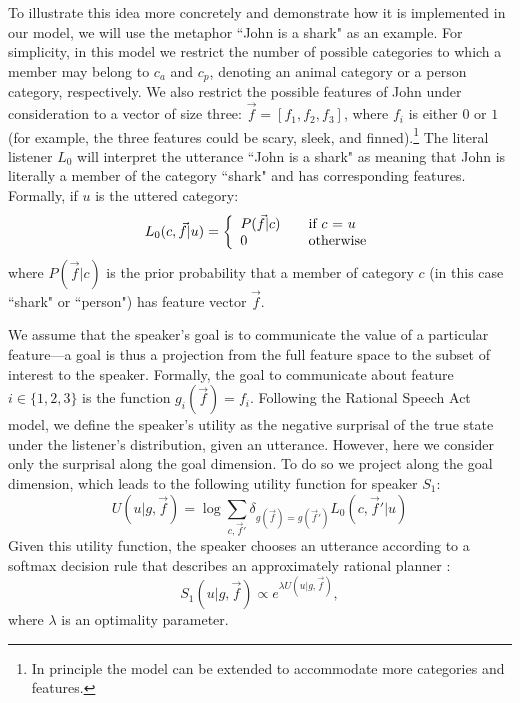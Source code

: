\documentclass[10pt,letterpaper]{article}
\begin{document}
To illustrate this idea more concretely and demonstrate how it is implemented in our model, we will use the metaphor ``John is a shark" as an example. For simplicity, in this model we restrict the number of possible categories to which a member may belong to $c_a$ and $c_p$, denoting an animal category or a person category, respectively. We also restrict the possible features of John under consideration to a vector of size three: $\vec f = [f_1, f_2, f_3]$, where $f_i$ is either $0$ or $1$ (for example, the three features could be scary, sleek, and finned).\footnote{In principle the model can be extended to accommodate more categories and features.}
The literal listener $L_0$ will interpret the utterance ``John is a shark" as meaning that John is literally a member of the category ``shark" and has corresponding features. Formally, if $u$ is the uttered category:
\[ L_0(c, \vec f |u) = \left\{ 
  \begin{array}{l l}
    P(\vec f | c) & \quad \text{if $c$ = $u$}\\
    0 & \quad \text{otherwise}
  \end{array} \right.\]
where $P(\vec f | c)$ is the prior probability that a member of category $c$ (in this case ``shark" or ``person") has feature vector $\vec f$.

We assume that the speaker's goal is to communicate the value of a particular feature---a goal is thus a projection from the full feature space to the subset of interest to the speaker. Formally, the goal to communicate about feature $i \in \{1,2,3\}$ is the function $g_i(\vec f) = f_i$. Following the Rational Speech Act model, we define the speaker's utility as the negative surprisal of the true state under the listener's distribution, given an utterance. However, here we consider only the surprisal along the goal dimension. 
To do so we project along the goal dimension, which leads to the following utility function for speaker $S_1$:
\begin{equation}
U(u | g, \vec f) = \log \sum_{c,\vec f'} \delta_{g(\vec f)=g(\vec f')} L_0(c, \vec f' |u)
\end{equation}
Given this utility function, the speaker chooses an utterance according to a softmax decision rule that describes an approximately rational planner \cite{sutton1998reinforcement}:
\begin{equation}
S_1(u | g, \vec f) \propto e^{\lambda U(u | g, \vec f)},
\end{equation}
where $\lambda$ is an optimality parameter. 
\end{document}
